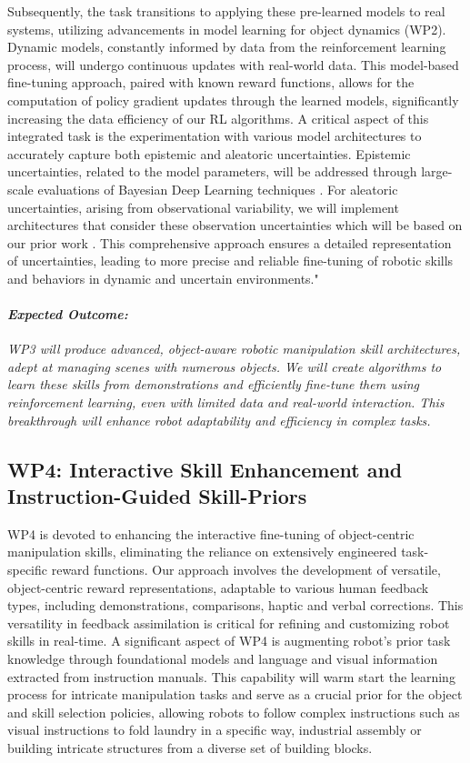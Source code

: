 \documentclass{erc-B2}
\begin{document}
\begin{enumerate}
Subsequently, the task transitions to applying these pre-learned models to real systems, utilizing advancements in model learning for object dynamics (WP2). Dynamic models, constantly informed by data from the reinforcement learning process, will undergo continuous updates with real-world data. This model-based fine-tuning approach, paired with known reward functions, allows for the computation of policy gradient updates through the learned models, significantly increasing the data efficiency of our RL algorithms. A critical aspect of this integrated task is the experimentation with various model architectures to accurately capture both epistemic and aleatoric uncertainties. Epistemic uncertainties, related to the model parameters, will be addressed through large-scale evaluations of Bayesian Deep Learning techniques \cite{seligmann2023beyond}. For aleatoric uncertainties, arising from observational variability, we will implement architectures that consider these observation uncertainties which will be based on our prior work \cite{becker19RKN}. This comprehensive approach ensures a detailed representation of uncertainties, leading to more precise and reliable fine-tuning of robotic skills and behaviors in dynamic and uncertain environments."

\end{enumerate}
\paragraph{\textit{Expected Outcome:}} \textit{WP3 will produce advanced, object-aware robotic manipulation skill architectures, adept at managing scenes with numerous objects. We will create algorithms to learn these skills from demonstrations and efficiently fine-tune them using reinforcement learning, even with limited data and real-world interaction. This breakthrough will enhance robot adaptability and efficiency in complex tasks.}

\subsection{WP4:  Interactive Skill Enhancement and Instruction-Guided Skill-Priors}
WP4 is devoted to enhancing the interactive fine-tuning of object-centric manipulation skills, eliminating the reliance on extensively engineered task-specific reward functions. Our approach involves the development of versatile, object-centric reward representations, adaptable to various human feedback types, including demonstrations, comparisons, haptic and verbal corrections. This versatility in feedback assimilation is critical for refining and customizing robot skills in real-time. 
A significant aspect of WP4 is augmenting robot's prior task knowledge through foundational models
and language and visual information extracted from instruction manuals. This capability will warm start the learning process for intricate manipulation tasks and serve as a crucial prior for the object and skill selection policies, allowing robots to follow complex instructions such as visual instructions to fold laundry in a specific way, industrial assembly or building intricate structures from a diverse set of building blocks.
\end{document}
